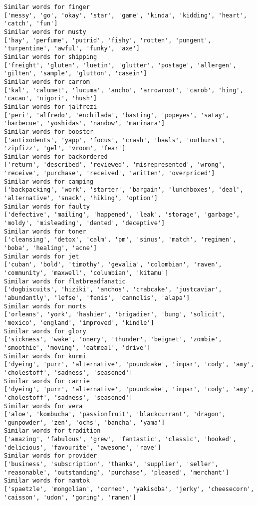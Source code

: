 \documentclass[11pt]{article}
\begin{document}
\begin{Verbatim}[commandchars=\\\{\}]
Similar words for finger
['messy', 'go', 'okay', 'star', 'game', 'kinda', 'kidding', 'heart', 'catch', 'fun']
Similar words for musty
['hay', 'perfume', 'putrid', 'fishy', 'rotten', 'pungent', 'turpentine', 'awful', 'funky', 'axe']
Similar words for shipping
['freight', 'gluten', 'luetin', 'glutter', 'postage', 'allergen', 'gilten', 'sample', 'glutton', 'casein']
Similar words for carrom
['kal', 'calumet', 'lucuma', 'ancho', 'arrowroot', 'carob', 'hing', 'cacao', 'nigori', 'hush']
Similar words for jalfrezi
['peri', 'alfredo', 'enchilada', 'basting', 'popeyes', 'satay', 'barbecue', 'yoshidas', 'nandow', 'marinara']
Similar words for booster
['antixodents', 'yapp', 'focus', 'crash', 'bawls', 'outburst', 'zipfizz', 'gel', 'vroom', 'fear']
Similar words for backordered
['return', 'described', 'reviewed', 'misrepresented', 'wrong', 'receive', 'purchase', 'received', 'written', 'overpriced']
Similar words for camping
['backpacking', 'work', 'starter', 'bargain', 'lunchboxes', 'deal', 'alternative', 'snack', 'hiking', 'option']
Similar words for faulty
['defective', 'mailing', 'happened', 'leak', 'storage', 'garbage', 'moldy', 'misleading', 'dented', 'deceptive']
Similar words for toner
['cleansing', 'detox', 'calm', 'pm', 'sinus', 'match', 'regimen', 'boba', 'healing', 'acne']
Similar words for jet
['cuban', 'bold', 'timothy', 'gevalia', 'colombian', 'raven', 'community', 'maxwell', 'columbian', 'kitamu']
Similar words for flatbreadfanatic
['dogbiscuits', 'hiziki', 'anchos', 'crabcake', 'justcaviar', 'abundantly', 'lefse', 'fenis', 'cannolis', 'alapa']
Similar words for morts
['orleans', 'york', 'hashier', 'brigadier', 'bung', 'solicit', 'mexico', 'england', 'improved', 'kindle']
Similar words for glory
['sickness', 'wake', 'onery', 'thunder', 'beignet', 'zombie', 'smoothie', 'moving', 'oatmeal', 'drive']
Similar words for kurmi
['dyeing', 'purr', 'alternative', 'poundcake', 'impar', 'cody', 'amy', 'cholestoff', 'sadness', 'seasoned']
Similar words for carrie
['dyeing', 'purr', 'alternative', 'poundcake', 'impar', 'cody', 'amy', 'cholestoff', 'sadness', 'seasoned']
Similar words for vera
['aloe', 'kombucha', 'passionfruit', 'blackcurrant', 'dragon', 'gunpowder', 'zen', 'ochs', 'bancha', 'yama']
Similar words for tradition
['amazing', 'fabulous', 'grew', 'fantastic', 'classic', 'hooked', 'delicious', 'favourite', 'awesome', 'rave']
Similar words for provider
['business', 'subscription', 'thanks', 'supplier', 'seller', 'reasonable', 'outstanding', 'purchase', 'pleased', 'merchant']
Similar words for namtok
['spaetzle', 'mongolian', 'corned', 'yakisoba', 'jerky', 'cheesecorn', 'caisson', 'udon', 'goring', 'ramen']

\end{Verbatim}
\end{document}
